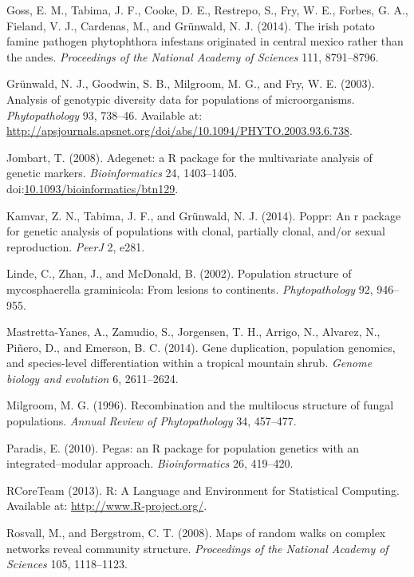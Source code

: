 \documentclass{frontiersSCNS} %
\begin{document}
Goss, E. M., Tabima, J. F., Cooke, D. E., Restrepo, S., Fry, W. E.,
Forbes, G. A., Fieland, V. J., Cardenas, M., and Gr{ü}nwald, N. J.
(2014). The irish potato famine pathogen phytophthora infestans
originated in central mexico rather than the andes. \emph{Proceedings of
the National Academy of Sciences} 111, 8791--8796.

Grünwald, N. J., Goodwin, S. B., Milgroom, M. G., and Fry, W. E. (2003).
Analysis of genotypic diversity data for populations of microorganisms.
\emph{Phytopathology} 93, 738--46. Available at:
\url{http://apsjournals.apsnet.org/doi/abs/10.1094/PHYTO.2003.93.6.738}.

Jombart, T. (2008). Adegenet: a R package for the multivariate analysis
of genetic markers. \emph{Bioinformatics} 24, 1403--1405.
doi:\href{http://dx.doi.org/10.1093/bioinformatics/btn129}{10.1093/bioinformatics/btn129}.

Kamvar, Z. N., Tabima, J. F., and Gr{ü}nwald, N. J. (2014). Poppr: An r
package for genetic analysis of populations with clonal, partially
clonal, and/or sexual reproduction. \emph{PeerJ} 2, e281.

Linde, C., Zhan, J., and McDonald, B. (2002). Population structure of
mycosphaerella graminicola: From lesions to continents.
\emph{Phytopathology} 92, 946--955.

Mastretta-Yanes, A., Zamudio, S., Jorgensen, T. H., Arrigo, N., Alvarez,
N., Pi{ñ}ero, D., and Emerson, B. C. (2014). Gene duplication,
population genomics, and species-level differentiation within a tropical
mountain shrub. \emph{Genome biology and evolution} 6, 2611--2624.

Milgroom, M. G. (1996). Recombination and the multilocus structure of
fungal populations. \emph{Annual Review of Phytopathology} 34, 457--477.

Paradis, E. (2010). Pegas: an R package for population genetics with an
integrated--modular approach. \emph{Bioinformatics} 26, 419--420.

RCoreTeam (2013). R: A Language and Environment for Statistical
Computing. Available at: \url{http://www.R-project.org/}.

Rosvall, M., and Bergstrom, C. T. (2008). Maps of random walks on
complex networks reveal community structure. \emph{Proceedings of the
National Academy of Sciences} 105, 1118--1123.
\end{document}
